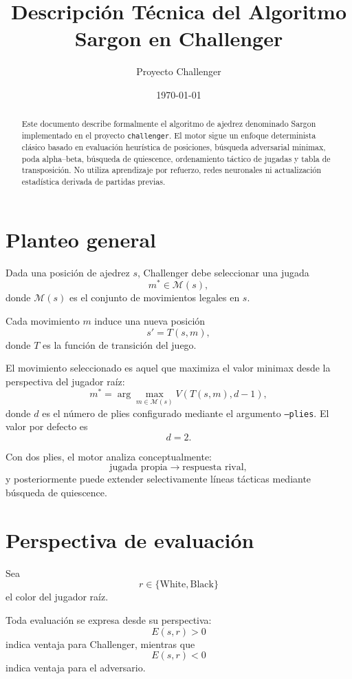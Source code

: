 \documentclass[11pt,a4paper]{article}
\title{Descripción Técnica del Algoritmo Sargon en Challenger}
\author{Proyecto Challenger}
\date{\today}
\begin{document}
\maketitle

\begin{abstract}
Este documento describe formalmente el algoritmo de ajedrez denominado Sargon
implementado en el proyecto \texttt{challenger}. El motor sigue un enfoque
determinista clásico basado en evaluación heurística de posiciones, búsqueda
adversarial minimax, poda alpha--beta, búsqueda de quiescence, ordenamiento
táctico de jugadas y tabla de transposición. No utiliza aprendizaje por refuerzo,
redes neuronales ni actualización estadística derivada de partidas previas.
\end{abstract}

\tableofcontents
\newpage

\section{Planteo general}

Dada una posición de ajedrez $s$, Challenger debe seleccionar una jugada
\[
m^\ast \in \mathcal{M}(s),
\]
donde $\mathcal{M}(s)$ es el conjunto de movimientos legales en $s$.

Cada movimiento $m$ induce una nueva posición
\[
s' = T(s,m),
\]
donde $T$ es la función de transición del juego.

El movimiento seleccionado es aquel que maximiza el valor minimax desde la
perspectiva del jugador raíz:
\[
m^\ast =
\arg\max_{m\in\mathcal{M}(s)}
V(T(s,m),d-1),
\]
donde $d$ es el número de plies configurado mediante el argumento
\texttt{--plies}. El valor por defecto es
\[
d=2.
\]

Con dos plies, el motor analiza conceptualmente:
\[
\text{jugada propia} \rightarrow \text{respuesta rival},
\]
y posteriormente puede extender selectivamente líneas tácticas mediante
búsqueda de quiescence.

\section{Perspectiva de evaluación}

Sea
\[
r\in\{\text{White},\text{Black}\}
\]
el color del jugador raíz.

Toda evaluación se expresa desde su perspectiva:
\[
E(s,r)>0
\]
indica ventaja para Challenger, mientras que
\[
E(s,r)<0
\]
indica ventaja para el adversario.
\end{document}
